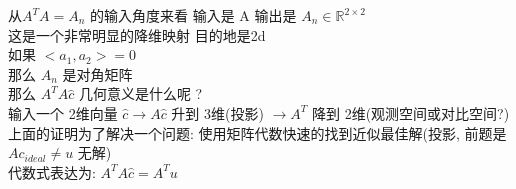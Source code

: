 \documentclass[12pt]{article}
\begin{document}
\begin{flushleft}
    从$A^{T}A = A_{n}$ 的输入角度来看 输入是 A 输出是 $A_{n} \in \mathbb{R}^{2 \times 2}$ \\
    这是一个非常明显的降维映射 目的地是2d \\
    如果 $<a_{1}, a_{2}> = 0 $ \\
    那么 $A_{n}$ 是对角矩阵 \\

    那么 $A^{T}A\hat{c}$ 几何意义是什么呢 ? \\
    输入一个 2维向量  $ \hat{c} \to A\hat{c}$ 升到 3维(投影) $ \to A^{T}$ 降到 2维(观测空间或对比空间?) \\

    上面的证明为了解决一个问题: 使用矩阵代数快速的找到近似最佳解(投影, 前题是 $Ac_{ideal} \neq u$ 无解) \\
    代数式表达为: $A^{T}A\hat{c} = A^{T}u$

\end{flushleft}
\end{document}
